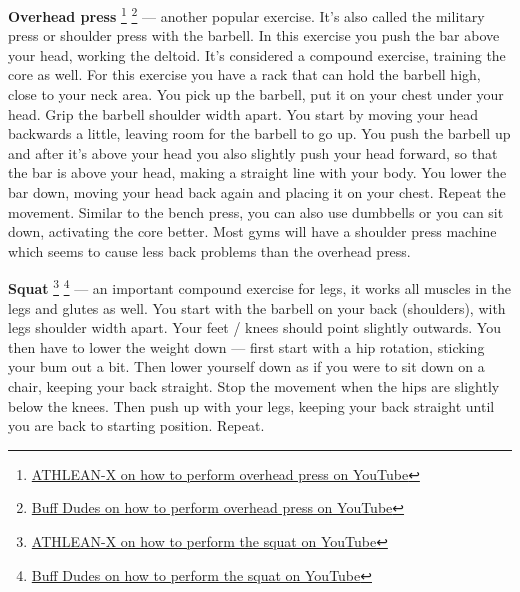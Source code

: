 \documentclass[openany, 12pt]{book}
\begin{document}
        \textbf{Overhead press}
        \footnote{\href{https://www.youtube.com/watch?v=2N5P_iWkluQ}{ATHLEAN-X on how to perform overhead press on YouTube}}
        \footnote{\href{https://www.youtube.com/watch?v=F3QY5vMz_6I}{Buff Dudes on how to perform overhead press on YouTube}}
        --- another popular exercise. It's also called the military press or shoulder press with the barbell. In this exercise you push the bar above your head, working the
        deltoid. It's considered a compound exercise, training the core as well. For this exercise you have a rack that can hold the barbell high, close to your neck area. You pick up
        the barbell, put it on your chest under your head. Grip the barbell shoulder width apart. You start by moving your head backwards a little, leaving room for the barbell to go up.
        You push the barbell up and after it's above your head you also slightly push your head forward, so that the bar is above your head, making a straight line with your body. You lower
        the bar down, moving your head back again and placing it on your chest. Repeat the movement. Similar to the bench press, you can also use dumbbells or you can sit down, activating the
        core better. Most gyms will have a shoulder press machine which seems to cause less back problems than the overhead press.

        \textbf{Squat}
        \footnote{\href{https://www.youtube.com/watch?v=q1fCgfieNEs}{ATHLEAN-X on how to perform the squat on YouTube}}
        \footnote{\href{https://www.youtube.com/watch?v=Dy28eq2PjcM}{Buff Dudes on how to perform the squat on YouTube}}
        --- an important compound exercise for legs, it works all muscles in the legs and glutes as well. You start with the barbell on your back (shoulders), with legs shoulder width apart.
        Your feet / knees should point slightly outwards.
        You then have to lower the weight down --- first start with a hip rotation, sticking your bum out a bit. Then lower yourself down as if you were to sit down on a chair, keeping your
        back straight. Stop the movement when the hips are slightly below the knees. Then push up with your legs, keeping your back straight until you are back to starting position. Repeat.
\end{document}
